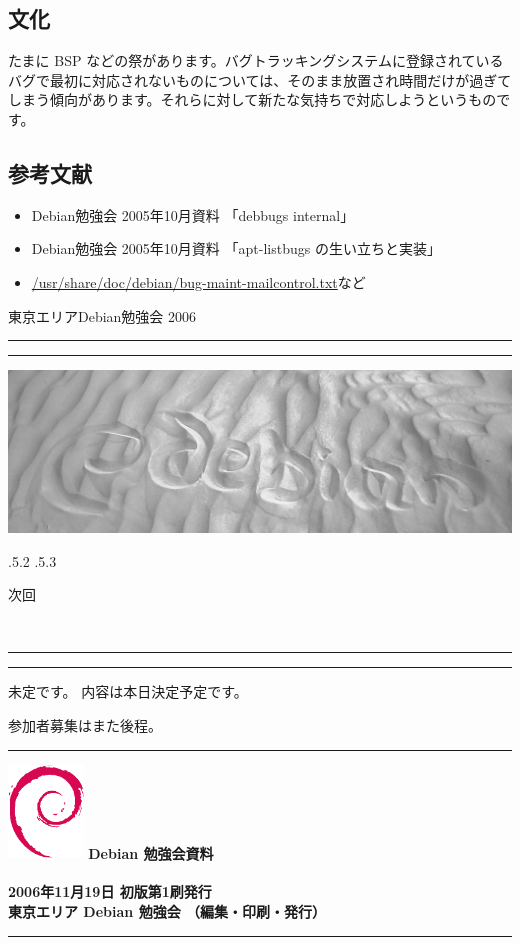 \documentclass[mingoth,a4paper]{jsarticle}
\makeatletter
\renewcommand{\section}{\@startsection{section}{1}{\z@}%
    {\Cvs \@plus.5\Cdp \@minus.2\Cdp}%
    {.5\Cvs \@plus.3\Cdp}%
    {\normalfont\Huge\headfont\raggedright\centering}} %
\newcommand{\dancersection}[2]{%
\newpage
東京エリアDebian勉強会 2006
\hrule
\vspace{0.5mm}
\hrule
\hfill{}\includegraphics[width=16cm]{image2006-natsu/guruguru-sand-light.png}\\
\vspace{-5cm}
\begin{center}
\section{#1}
\end{center}
\hfill{}\colorbox{white}{#2}\hspace{3cm}\space\\
\vspace{1cm}
\hrule
\vspace{0.5mm}
\hrule
\vspace{1cm}
}
\makeatother
\begin{document}
\subsection{文化}

たまに BSP などの祭があります。バグトラッキングシステムに登録されている
バグで最初に対応されないものについては、そのまま放置され時間だけが過ぎて
しまう傾向があります。それらに対して新たな気持ちで対応しようというもので
す。

\subsection{参考文献}

\begin{itemize}
 \item Debian勉強会 2005年10月資料 「debbugs internal」
 \item Debian勉強会 2005年10月資料 「apt-listbugs の生い立ちと実装」
 \item \url{/usr/share/doc/debian/bug-maint-mailcontrol.txt}など
\end{itemize}

\dancersection{次回}{}

未定です。
内容は本日決定予定です。

参加者募集はまた後程。

\newpage

\vspace*{15cm}
\hrule
\vspace{2mm}
\includegraphics[width=2cm]{image200502/openlogo-nd.eps}
\noindent \Large \bf Debian 勉強会資料\\ \\
\noindent \normalfont 2006年11月19日 \hspace{5mm}  初版第1刷発行\\
\noindent \normalfont 東京エリア Debian 勉強会 （編集・印刷・発行）\\
\hrule
\end{document}
